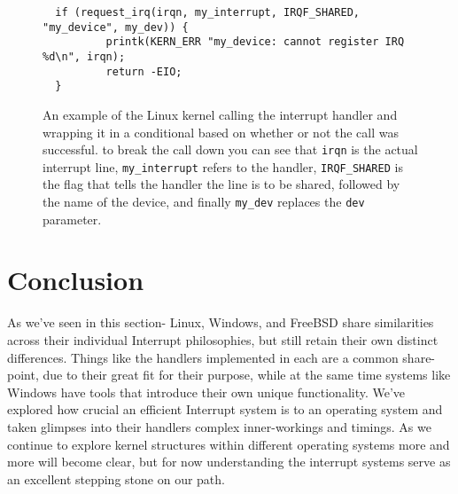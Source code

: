 \documentclass[10pt,draftclsnofoot,onecolumn]{IEEEtran}
\begin{document}
\begin{figure}[h]
\begin{lstlisting}
  if (request_irq(irqn, my_interrupt, IRQF_SHARED, "my_device", my_dev)) {
          printk(KERN_ERR "my_device: cannot register IRQ %d\n", irqn);
          return -EIO;
  }
\end{lstlisting}
\centering
\captionsetup{justification=centering}
\caption{
  An example of the Linux kernel calling the interrupt handler and wrapping it in a conditional based on whether or not the call was successful.
  to break the call down you can see that \texttt{irqn} is the actual interrupt line, \texttt{my\_interrupt} refers to the handler, \texttt{IRQF\_SHARED} is the flag that tells the handler the line is to be shared, followed by the name of the device, and finally \texttt{my\_dev} replaces the \texttt{dev} parameter.
}
\label{code:linux_handler}
\end{figure}

\section{Conclusion}
\label{sec:Conclusion}
\par As we've seen in this section- Linux, Windows, and FreeBSD share similarities across their individual Interrupt philosophies, but still retain their own distinct differences.
Things like the handlers implemented in each are a common share-point, due to their great fit for their purpose, while at the same time systems like Windows have tools that introduce their own unique functionality.
We've explored how crucial an efficient Interrupt system is to an operating system and taken glimpses into their handlers complex inner-workings and timings.
As we continue to explore kernel structures within different operating systems more and more will become clear, but for now understanding the interrupt systems serve as an excellent stepping stone on our path.

%
%
%



\end{document}

